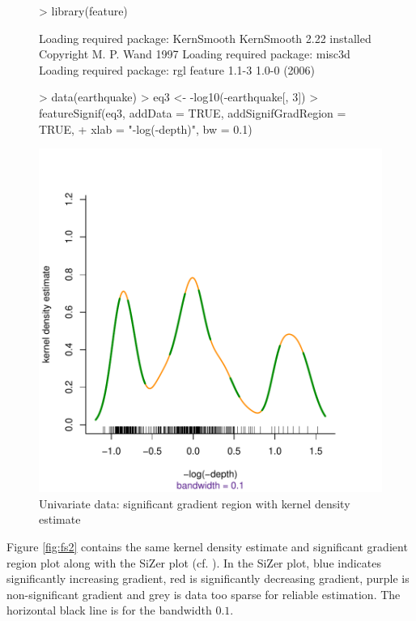 \documentclass[a4paper]{article}
\begin{document}
\begin{figure}
\begin{center}
\begin{Schunk}
\begin{Sinput}
> library(feature)
\end{Sinput}
\begin{Soutput}
Loading required package: KernSmooth
KernSmooth 2.22 installed
Copyright M. P. Wand 1997
Loading required package: misc3d
Loading required package: rgl
feature 1.1-3 1.0-0 (2006)
\end{Soutput}
\begin{Sinput}
> data(earthquake)
> eq3 <- -log10(-earthquake[, 3])
> featureSignif(eq3, addData = TRUE, addSignifGradRegion = TRUE, 
+     xlab = "-log(-depth)", bw = 0.1)
\end{Sinput}
\end{Schunk}
\includegraphics{feature-001}
\caption{Univariate data: significant gradient region with 
kernel density estimate}
\label{fig:fs1}
\end{center}
\end{figure}

Figure \ref{fig:fs2} contains the same kernel density estimate and 
significant gradient region plot along with the SiZer plot (cf. ).
In the SiZer plot, blue indicates significantly increasing gradient,
red is significantly decreasing gradient, purple is non-significant gradient
and grey is data too sparse for reliable estimation. The horizontal black line
is for the bandwidth $0.1$.
\end{document}

